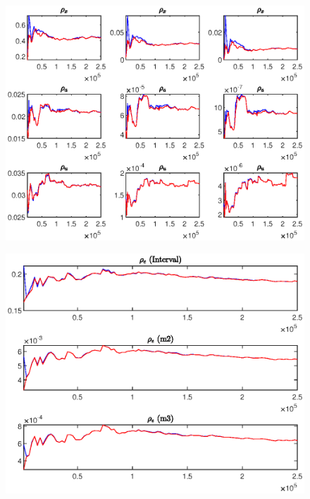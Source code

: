 \documentclass[11pt,preprint, authoryear]{elsarticle}
\let\origfigure\figure
\let\endorigfigure\endfigure
\renewenvironment{figure}[1][2] {
    \expandafter\origfigure\expandafter[H]
} {
    \endorigfigure
}
\numberwithin{equation}{section}
\numberwithin{figure}{section}
\numberwithin{table}{section}
\begin{document}
\begin{figure}
\begin{subfigure}[H]{0.49\textwidth}
         \includegraphics[width=\textwidth]{code/mcmc_u5}
     \end{subfigure}
      \begin{subfigure}[H]{0.49\textwidth}
         \centering
         \includegraphics[width=\textwidth]{code/mcmc_u6}
     \end{subfigure}
        \caption{MCMC univariate diagnostics of structural parameters for extended sample under the estimated Taylor rule [@brooks1998]. For each parameter, the first column shows the convergence diagnostics for the 80 per cent interval. The second and third columns shows the estimates of the second and third central moments (m2 and m3), respectively. The red line shows the 80 per cent quantile range based on the pooled draws from all sequences and the blue line shows the mean interval range based on the 25 000 draws of the individual sequences.}
        \label{mcmcu2}
\end{figure}
\end{document}
